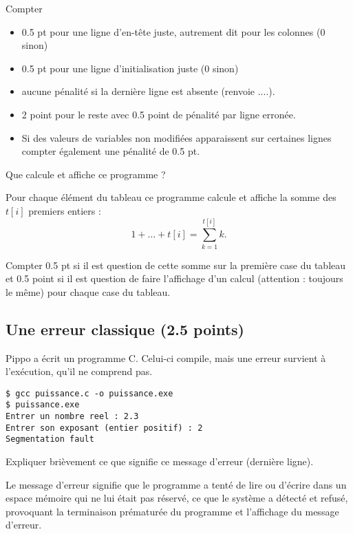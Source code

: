     \begin{baremeenv}
      Compter
      \begin{itemize}
      \item 0.5 pt pour une ligne d'en-tête juste, autrement dit pour
        les colonnes (0 sinon)
      \item 0.5 pt pour une ligne d'initialisation juste (0 sinon)
      \item aucune pénalité si la dernière ligne est absente (renvoie
        ....).
      \item 2 point pour le reste avec 0.5 point de pénalité par ligne
        erronée.
      \item Si des valeurs de variables non modifiées apparaissent sur
        certaines lignes compter également une pénalité de 0.5 pt.
      \end{itemize}
    \end{baremeenv}

\question
Que calcule et affiche ce programme ?

\begin{correction}
   Pour chaque élément du tableau ce programme calcule et affiche la somme des $t[i]$ premiers entiers  : \[1 + \ldots + t[i] = \sum_{k = 1}^{t[i]} k.\]
\end{correction}

\begin{baremeenv}
  Compter 0.5 pt si il est question de cette somme sur la première case du tableau et 0.5 point si il est question de faire l'affichage d'un calcul (attention : toujours le même) pour chaque case du tableau.
\end{baremeenv}


\subsection{Une erreur classique (2.5 points)} 

Pippo a écrit un programme C. Celui-ci compile, mais une erreur survient à l'exécution, qu'il ne comprend pas.

\begin{verbatim}
$ gcc puissance.c -o puissance.exe
$ puissance.exe
Entrer un nombre reel : 2.3
Entrer son exposant (entier positif) : 2
Segmentation fault
\end{verbatim}
\question
Expliquer brièvement ce que signifie ce message d'erreur (dernière ligne).
\begin{correction}
Le message d'erreur  signifie que le programme a tenté de lire ou d'écrire dans un espace mémoire qui ne lui était pas réservé, ce que le système a détecté et refusé, provoquant la terminaison prématurée du programme et l'affichage du message d'erreur. 
\end{correction}

